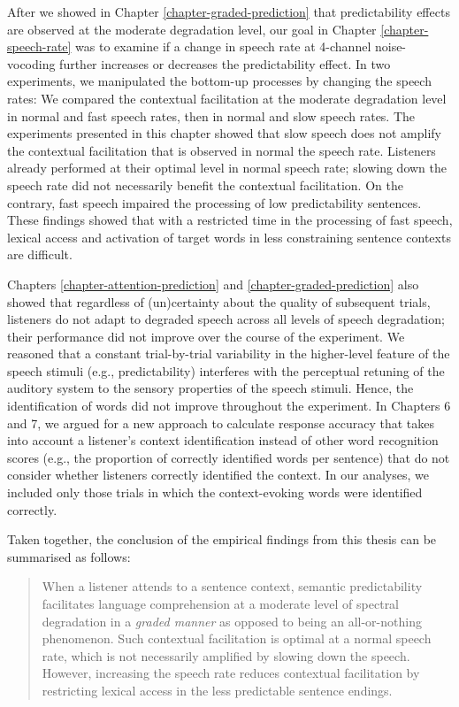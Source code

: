 \documentclass[a4paper, nobind]{templates/ociamthesis}
\begin{document}
After we showed in Chapter \ref{chapter-graded-prediction} that predictability effects are observed at the moderate degradation level,
our goal in Chapter \ref{chapter-speech-rate} was to examine if a change in speech rate at 4-channel noise-vocoding
further increases or decreases the predictability effect.
In two experiments, we manipulated the bottom-up processes by changing the speech rates:
We compared the contextual facilitation at the moderate degradation level in normal and fast speech rates,
then in normal and slow speech rates.
The experiments presented in this chapter showed that slow speech does not amplify the contextual facilitation that is observed in normal the speech rate.
Listeners already performed at their optimal level in normal speech rate;
slowing down the speech rate did not necessarily benefit the contextual facilitation.
On the contrary, fast speech impaired the processing of low predictability sentences.
These findings showed that with a restricted time in the processing of fast speech,
lexical access and activation of target words in less constraining sentence contexts are difficult.

Chapters \ref{chapter-attention-prediction} and \ref{chapter-graded-prediction} also showed that regardless of (un)certainty about the quality of subsequent trials,
listeners do not adapt to degraded speech across all levels of speech degradation;
their performance did not improve over the course of the experiment.
We reasoned that a constant trial-by-trial variability in the higher-level feature of the speech stimuli (e.g., predictability)
interferes with the perceptual retuning of the auditory system to the sensory properties of the speech stimuli.
Hence, the identification of words did not improve throughout the experiment.
In Chapters 6 and 7, we argued for a new approach to calculate response accuracy that takes into account a listener's context identification instead of other word recognition scores (e.g., the proportion of correctly identified words per sentence)
that do not consider whether listeners correctly identified the context.
In our analyses, we included only those trials in which the context-evoking words were identified correctly.

Taken together, the conclusion of the empirical findings from this thesis can be summarised as follows:

\begin{quote}
When a listener attends to a sentence context, semantic predictability facilitates language comprehension at a moderate level of spectral degradation in a \emph{graded manner} as opposed to being an all-or-nothing phenomenon.
Such contextual facilitation is optimal at a normal speech rate, which is not necessarily amplified by slowing down the speech.
However, increasing the speech rate reduces contextual facilitation by restricting lexical access in the less predictable sentence endings.
\end{quote}
\end{document}
